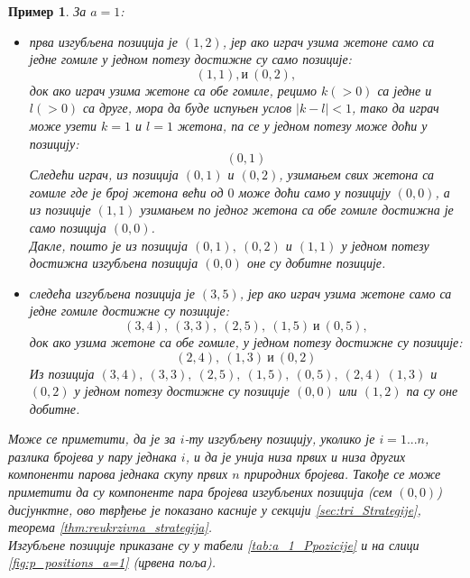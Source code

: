 \documentclass[a4paper]{article}
\newtheorem{example}{Пример}
\begin{document}
\begin{example}
	За $ a = 1 $:
		\begin{itemize}
			\item прва изгубљена позиција је $ (1, 2) $, јер ако играч узима жетоне само са једне гомиле у једном потезу достижне су само позиције:
				\begin{displaymath}
					(1, 1), \text{и}\ (0, 2),
				\end{displaymath}
			док ако играч узима жетоне са обе гомиле, рецимо $ k (> 0) $ са једне и $ l (> 0) $ са друге, мора да буде испуњен услов $ |k - l| < 1 $, тако да играч може узети $ k = 1 $ и $ l = 1 $ жетона, па се у једном потезу може доћи у позицију:
				\begin{displaymath}
					(0, 1)
				\end{displaymath}
			Следећи играч, из позиција $ (0, 1) $ и $ (0, 2) $, узимањем свих жетона са гомиле где је број жетона већи од $ 0 $ може доћи само у позицију $ (0, 0) $, а из позиције $ (1, 1) $ узимањем по једног жетона са обе гомиле достижна је само позиција $ (0, 0) $.\\
			Дакле, пошто је из позиција $ (0, 1),\ (0, 2) $ и $ (1, 1) $ у једном потезу достижна изгубљена позиција $ (0,0) $ оне су добитне позиције.
			\item следећа изгубљена позиција је $ (3, 5) $, јер ако играч узима жетоне само са једне гомиле достижне су позиције:
				\begin{displaymath}
					(3, 4),\ (3, 3),\ (2, 5),\ (1, 5)\  \text{и}\ (0, 5),
				\end{displaymath}
			док ако узима жетоне са обе гомиле, у једном потезу достижне су позиције:
				\begin{displaymath}
					(2, 4),\ (1, 3)\ \text{и}\ (0, 2)
				\end{displaymath}
			Из позиција $ (3, 4),\ (3, 3),\ (2, 5),\ (1, 5),\ (0, 5),\ (2, 4)\ (1, 3) $ и $ (0, 2) $ у једном потезу достижне су позиције $ (0, 0) $ или $ (1, 2) $ па су оне добитне.
		\end{itemize}
		Може се приметити, да је за $ i $-ту изгубљену позицију, уколико је $ i = 1...n $, разлика бројева у пару једнака $ i $, и да је унија низа првих и низа других компоненти парова једнака скупу првих $ n $ природних бројева. Такође се може приметити да су компоненте пара бројева изгубљених позиција (сем $ (0, 0) $) дисјунктне, ово тврђење је показано касније у секцији \ref{sec:tri_Strategije}, теорема \ref{thm:reukrzivna_strategija}.\\
		Изгубљене позиције приказане су у табели \ref{tab:a_1_Ppozicije} и на слици \ref{fig:p_positions_a=1} (црвена поља).
\end{example}
	
\end{document}
